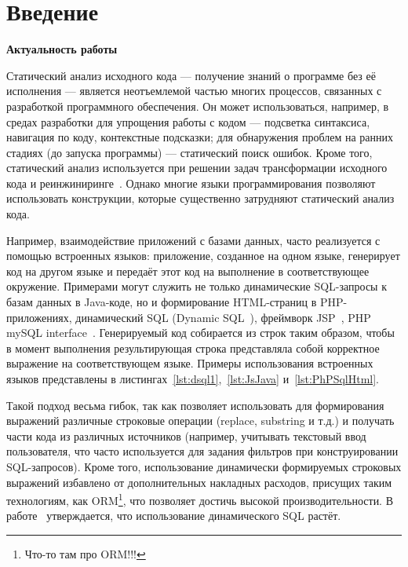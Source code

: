 \chapter*{Введение}							%
\textbf{Актуальность работы}

Статический анализ исходного кода --- получение знаний о программе без её исполнения --- является неотъемлемой частью многих процессов, связанных с разработкой программного обеспечения. Он может использоваться, например, в средах разработки для упрощения работы с кодом --- подсветка синтаксиса, навигация по коду, контекстные подсказки; для обнаружения проблем на ранних стадиях (до запуска программы) --- статический поиск ошибок.  Кроме того, статический анализ используется при решении задач трансформации исходного кода и реинжиниринге~\cite{reengANT}. Однако многие языки программирования позволяют использовать конструкции, которые существенно затрудняют статический анализ кода.

Например, взаимодействие приложений с базами данных, часто реализуется с помощью встроенных языков: приложение, созданное на одном языке, генерирует код на другом языке и передаёт этот код на выполнение в соответствующее окружение. Примерами могут служить не только динамические SQL-запросы к базам данных в Java-коде, но и формирование HTML-страниц в PHP-приложениях, динамический SQL (Dynamic SQL~\cite{DSQLISO}), фреймворк JSP~\cite{JSP}, PHP mySQL interface~\cite{PHPmySQL}. Генерируемый код собирается из строк таким образом, чтобы в момент выполнения результирующая строка представляла собой корректное выражение на соответствующем языке. Примеры использования встроенных языков представлены в листингах~\ref{lst:dsql1},~\ref{lst:JsJava} и~\ref{lst:PhPSqlHtml}. 

Такой подход весьма гибок, так как позволяет использовать для формирования выражений различные строковые операции (replace, substring и т.д.) и получать части кода из различных источников (например, учитывать текстовый ввод пользователя, что часто используется для задания фильтров при конструировании SQL-запросов). Кроме того, использование динамически формируемых строковых выражений избавлено от  дополнительных накладных расходов, присущих таким технологиям, как ORM\footnote{Что-то там про ORM!!!}, что позволяет достичь высокой производительности. В работе~\cite{DSQLInActiveUse} утверждается, что использование динамического SQL растёт.

